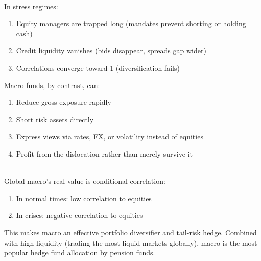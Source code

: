 \documentclass[a4paper,oneside,openany]{book}
\begin{document}
\begin{remark} \\
In stress regimes:
\begin{enumerate}[label=\roman*.]
\setlength{\itemsep}{0pt}
\item Equity managers are trapped long (mandates prevent shorting or holding cash)
\item Credit liquidity vanishes (bids disappear, spreads gap wider)
\item Correlations converge toward 1 (diversification fails)
\end{enumerate}
Macro funds, by contrast, can:
\begin{enumerate}[label=\roman*.]
\setlength{\itemsep}{0pt}
\item Reduce gross exposure rapidly
\item Short risk assets directly
\item Express views via rates, FX, or volatility instead of equities
\item Profit from the dislocation rather than merely survive it
\end{enumerate}
\end{remark}

\begin{remark} \\
Global macro's real value is conditional correlation:
\begin{enumerate}[label=\roman*.]
\setlength{\itemsep}{0pt}
\item In normal times: low correlation to equities
\item In crises: negative correlation to equities
\end{enumerate}
This makes macro an effective portfolio diversifier and tail-risk hedge. Combined with high liquidity (trading the most liquid markets globally), macro is the most popular hedge fund allocation by pension funds.
\end{remark}
\end{document}
